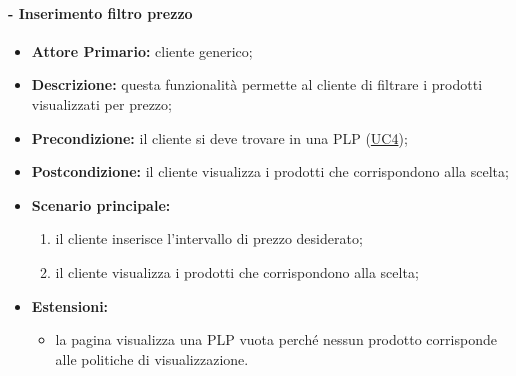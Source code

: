 \paragraph{ - Inserimento filtro prezzo}
\begin{itemize}
    \item \textbf{Attore Primario:} cliente generico;
    \item \textbf{Descrizione:} questa funzionalità permette al cliente di filtrare i prodotti visualizzati per prezzo;
    \item \textbf{Precondizione:} il cliente si deve trovare in una PLP (\hyperref[UC4]{UC4});
    \item \textbf{Postcondizione:} il cliente visualizza i prodotti che corrispondono alla scelta;
    \item \textbf{Scenario principale:}
    \begin{enumerate}
        \item il cliente inserisce l'intervallo di prezzo desiderato;
        \item il cliente visualizza i prodotti che corrispondono alla scelta;
    \end{enumerate}
    \item \textbf{Estensioni:}
    \begin{itemize}
        \item la pagina visualizza una PLP vuota perché nessun prodotto corrisponde alle politiche di visualizzazione.
    \end{itemize}
\end{itemize}

\stepsubsubUserCase
